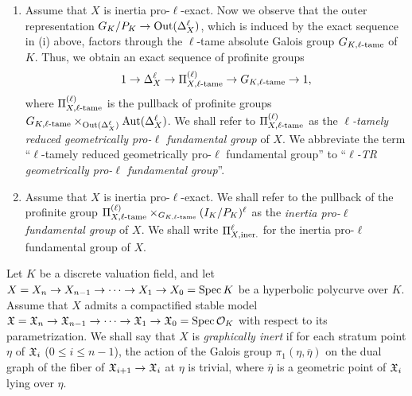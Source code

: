 \begin{defn}
\begin{enumerate}
    \[
      1 \to \GFG{X_i}^\ell \to \TRIGPRFG{\ell}{X_i} \to I_K/P_K \to 1
    \]
    factors through the maximal pro-$\ell$ quotient $(I_K/P_K)^\ell$ of $I_K/P_K$. (Here, we recall that the condition inertia pro-$\ell$-exactness implies (by definition, as a tautology) the condition geometrically pro-$\ell$-exactness.)
    \item Assume that $X$ is inertia pro-$\ell$-exact. Now we observe that the outer representation $G_K/P_K \to \mathrm{Out}(\Delta_{X}^\ell)$, which is induced by the exact sequence in (i) above, factors through the $\ell$-tame absolute Galois group $G_{K, \ell\text{-tame}}$ of $K$. Thus, we obtain an exact sequence of profinite groups
    \[
      1 \to \Delta_{X}^\ell \to \Pi^{(\ell)}_{X, \ell\text{-tame}} \to G_{K, \ell\text{-tame}} \to 1,
    \]
    where $\Pi^{(\ell)}_{X, \ell\text{-tame}}$ is the pullback of profinite groups $G_{K, \ell\text{-tame}} \times_{\mathrm{Out}(\Delta_{X}^\ell)} \mathrm{Aut}(\Delta_{X}^\ell)$. We shall refer to $\Pi^{(\ell)}_{X, \ell\text{-tame}}$ as the \emph{$\ell$-tamely reduced geometrically pro-$\ell$ fundamental group} of $X$. We abbreviate the term ``$\ell$-tamely reduced geometrically pro-$\ell$ fundamental group'' to ``\emph{$\ell$-TR geometrically pro-$\ell$ fundamental group}''.
    \item Assume that $X$ is inertia pro-$\ell$-exact. We shall refer to the pullback of the profinite group $\Pi^{(\ell)}_{X, \ell\text{-tame}} \times_{G_{K, \ell\text{-tame}}} (I_K/P_K)^\ell$ as the \emph{inertia pro-$\ell$ fundamental group} of $X$. We shall write $\Pi^{\ell}_{X, \text{iner.}}$ for the inertia pro-$\ell$ fundamental group of $X$.
  \end{enumerate}
\end{defn}

\begin{defn}
  Let $K$ be a discrete valuation field, and let $X = X_n \to X_{n - 1} \to \cdots \to X_1 \to X_0 = \mathrm{Spec} \, K$ be a hyperbolic polycurve over $K$. Assume that $X$ admits a compactified stable model $\mathfrak{X} = \mathfrak{X}_n \to \mathfrak{X}_{n - 1} \to \cdots \to \mathfrak{X}_1 \to \mathfrak{X}_0 = \mathrm{Spec} \, \mathcal{O}_K$ with respect to its parametrization. We shall say that $X$ is \emph{graphically inert} if for each stratum point $\eta$ of $\mathfrak{X}_i$ ($0 \leq i \leq n - 1$), the action of the Galois group $\pi_1(\eta, \overline{\eta})$ on the dual graph of the fiber of $\mathfrak{X}_{i + 1} \to \mathfrak{X}_i$ at $\eta$ is trivial, where $\overline{\eta}$ is a geometric point of $\mathfrak{X}_i$ lying over $\eta$.
\end{defn}

